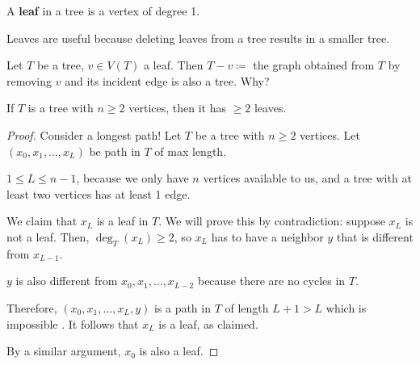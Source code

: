 \documentclass[a4paper]{article}
\begin{document}
\begin{definition}
	A \textbf{leaf} in a tree is a vertex of degree 1.
\end{definition}
\begin{remark}
	Leaves are useful because deleting leaves from a tree results in a smaller tree.
\end{remark}

\begin{problem}
	Let \( T \) be a tree, \( v \in  V(T) \) a leaf. Then \( T-v \coloneqq \) the graph obtained from \( T \) by removing \( v \) and its incident edge is also a tree. Why?
\end{problem}

\begin{prop}
	If \( T \) is a tree with \( n \ge 2 \) vertices, then it has \( \ge 2 \) leaves.
\end{prop}
\begin{proof}
	Consider a longest path! Let \( T \) be a tree with \( n\ge 2 \) vertices. Let \( (x_{0}, x_{1}, \ldots , x_L) \) be  path in \( T \) of max length.
	\begin{note}
		\( 1 \le L \le n - 1 \), because we only have \( n \) vertices available to us, and a tree with at least two vertices has at least 1 edge.
	\end{note}
	We claim that \( x_L \) is a leaf in \( T \). We will prove this by contradiction: suppose \( x_L \) is not a leaf. Then, \( \deg_T(x_L) \ge 2 \), so \( x_L \) has to have a neighbor \( y \) that is different from \( x_{L-1} \).
	\begin{note}
		\( y \) is also different from \( x_{0}, x_{1}, \ldots , x_{L - 2} \) because there are no cycles in \( T \).
	\end{note}
	Therefore, \( (x_{0}, x_{1}, \ldots, x_L, y) \) is a path in \( T \) of length \( L + 1 > L \) which is impossible \contra. It follows that \( x_L \) is a leaf, as claimed. \par
	By a similar argument, \( x_{0} \) is also a leaf.
\end{proof}
\end{document}
